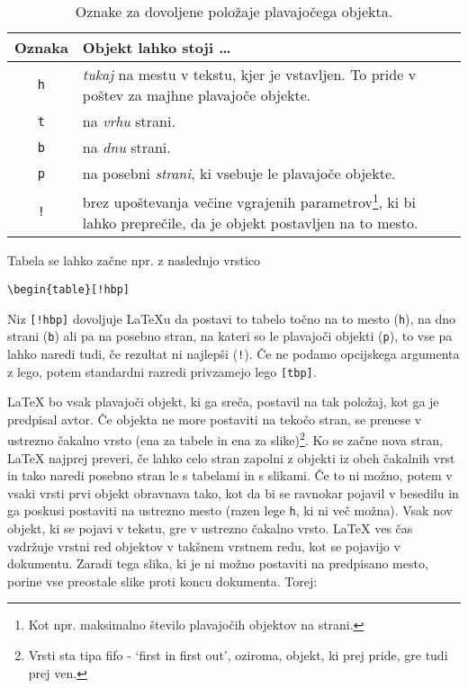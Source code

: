 \begin{table}[!bp]
\caption{Oznake za dovoljene položaje plavajočega objekta.}\label{tab:permiss}
\noindent \begin{minipage}{\textwidth}
\medskip
\begin{center}
\begin{tabular}{@{}cp{10cm}@{}}
Oznaka&Objekt lahko stoji \ldots\\
\hline
\rule{0pt}{1.05em}\texttt{h} & \emph{tukaj} na mestu v tekstu, kjer je vstavljen. 
  To pride v poštev za majhne plavajoče objekte.\\[0.3ex]
\texttt{t} & na \emph{vrhu} strani.\\[0.3ex]
\texttt{b} & na \emph{dnu} strani.\\[0.3ex]
\texttt{p} & na posebni \emph{strani}, ki vsebuje le plavajoče objekte.\\[0.3ex]
\texttt{!} & brez upoštevanja večine vgrajenih parametrov\footnote{Kot npr.
    maksimalno število plavajočih objektov na strani.}, ki bi lahko preprečile, da je objekt postavljen 
    na to mesto.
\end{tabular}
\end{center}
\end{minipage}
\end{table}

Tabela se lahko začne npr. z naslednjo vrstico
\begin{code}
\verb|\begin{table}[!hbp]|
\end{code}
\noindent Niz \verb|[!hbp]| dovoljuje \LaTeX{}u da postavi to tabelo 
točno na to mesto (\texttt{h}), na dno  strani (\texttt{b}) ali pa  
na posebno stran, na kateri so le plavajoči objekti (\texttt{p}), to vse pa lahko naredi tudi,
če rezultat ni najlepši (\texttt{!}). Če ne podamo opcijskega argumenta z lego, potem 
standardni razredi privzamejo lego \verb|[tbp]|.

\LaTeX{} bo vsak plavajoči objekt, ki ga sreča, postavil na tak položaj, kot ga je 
predpisal avtor. Če objekta ne more postaviti na tekočo stran, se prenese v ustrezno 
čakalno vrsto (ena za tabele in ena za slike)\footnote{Vrsti sta tipa fifo -
  `first in first out', oziroma, objekt, ki prej pride, gre tudi prej ven.}.  Ko se začne nova stran,
\LaTeX{} najprej preveri, če lahko celo stran zapolni z objekti iz obeh čakalnih vrst in tako naredi posebno
stran le s tabelami in s slikami. Če to ni možno, potem v vsaki vrsti prvi objekt obravnava 
tako, kot da bi se ravnokar pojavil v besedilu in ga poskusi postaviti na ustrezno mesto (razen lege \verb|h|, 
ki ni več možna). Vsak nov objekt, ki se pojavi v tekstu, gre v ustrezno čakalno vrsto. \LaTeX{} ves čas vzdržuje
vrstni red objektov v takšnem vrstnem redu, kot se pojavijo v dokumentu. Zaradi tega slika, ki je ni možno
postaviti na predpisano mesto, porine vse preostale slike proti koncu dokumenta.
Torej:

